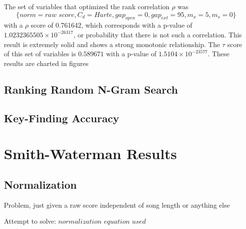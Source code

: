 The set of variables that optimized the rank correlation $\rho$ was \[ \{norm=\textit{raw score}, C_d=Harte, {gap}_{open}=0, {gap}_{ext}=95, m_x=5, m_s=0\} \] with a $\rho$ score of 0.761642, which corresponds with a p-value of $1.0232365505\times 10^{-26317}$, or probability that there is not such a correlation. This result is extremely solid and shows a strong monotonic relationship. The $\tau$ score of this set of variables is $0.589671$ with a p-value of $1.5104 \times 10^{-23577}$. These results are charted in figures



\subsection{Ranking Random N-Gram Search}

\subsection{Key-Finding Accuracy}

\section{Smith-Waterman Results}

\subsection{Normalization}

\item Problem, just given a raw score independent of song length or anything else

\item Attempt to solve: $normalization$ $equation$ $used$






